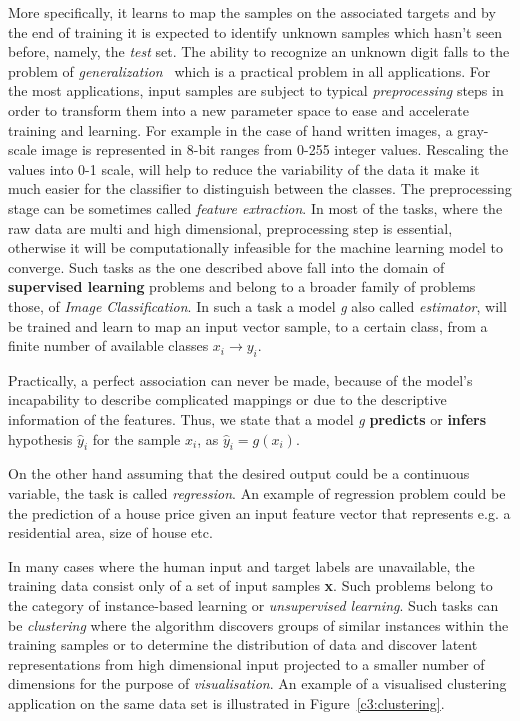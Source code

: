 More specifically, it learns to map the samples on the associated targets and by the end of training it is expected to identify unknown samples which hasn't seen before, namely, the \textit{test} set. The ability to recognize an unknown digit falls to the problem of \textit{generalization}~\cite{mitchell1986explanation} which is a practical problem in all applications.
For the most applications, input samples are subject to typical \textit{preprocessing} steps in order to transform them into a new parameter space to ease and accelerate training and learning. For example in the case of hand written images, a gray-scale image is represented in 8-bit ranges from 0-255 integer values. Rescaling the values into 0-1 scale, will help to reduce the variability of the data it make it much easier for the classifier to distinguish between the classes. The preprocessing stage can be sometimes called \textit{feature extraction}.
In most of the tasks, where the raw data are multi and high dimensional, preprocessing step is essential, otherwise it will be computationally infeasible for the machine learning model to converge.
Such tasks as the one described above fall into the domain of \textbf{supervised learning} problems and belong to a broader family of problems those, of \textit{Image Classification}. In such a task a model \textit{g} also called \textit{estimator}, will be trained and learn to map an input vector sample, to a certain class, from a finite number of available classes $x_i \rightarrow y_i$.

Practically, a perfect association can never be made, because of the model's incapability to describe complicated mappings or due to the descriptive information of the features. Thus, we state that a model \textit{g} \textbf{predicts} or \textbf{infers} hypothesis $\hat{y}_i$ for the sample $x_i$, as $\hat{y}_i = g(x_i)$.

On the other hand assuming that the desired output could be a continuous variable, the task is called \textit{regression}. An example of regression problem could be the prediction of a house price given an input feature vector that represents e.g. a residential area, size of house etc.

In many cases where the human input and target labels are unavailable, the training data consist only of a set of input samples \textbf{x}. Such problems belong to the category of instance-based learning or \textit{unsupervised learning}. Such tasks can be \textit{clustering} where the algorithm discovers groups of similar instances within the training samples or to determine the distribution of data and discover latent representations from high dimensional input projected to a smaller number of dimensions for the purpose of \textit{visualisation}. An example of a visualised clustering application on the same data set is illustrated in Figure~\ref{c3:clustering}.

